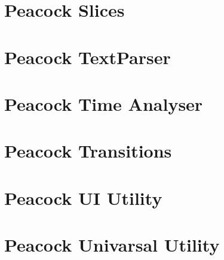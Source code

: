 \documentclass[a4paper,11pt,openany,oneside,english]{sphinxmanual}
\begin{document}
\section{Peacock Slices}
\label{\detokenize{modules/slices/readme:peacock-slices}}\label{\detokenize{modules/slices/readme::doc}}

\section{Peacock TextParser}
\label{\detokenize{modules/textparser/readme:peacock-textparser}}\label{\detokenize{modules/textparser/readme::doc}}

\section{Peacock Time Analyser}
\label{\detokenize{modules/timeanalyser/readme:peacock-time-analyser}}\label{\detokenize{modules/timeanalyser/readme::doc}}

\section{Peacock Transitions}
\label{\detokenize{modules/transitions/readme:peacock-transitions}}\label{\detokenize{modules/transitions/readme::doc}}

\section{Peacock UI Utility}
\label{\detokenize{modules/ui_utils/readme:peacock-ui-utility}}\label{\detokenize{modules/ui_utils/readme::doc}}

\section{Peacock Univarsal Utility}
\label{\detokenize{modules/utils/readme:peacock-univarsal-utility}}\label{\detokenize{modules/utils/readme::doc}}
\end{document}
